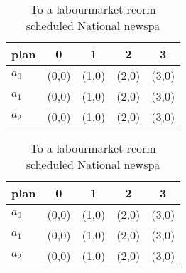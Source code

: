 \documentclass[a4paper]{article}
\begin{document}
\begin{table}
\begin{adjustbox}{width=0.6\columnwidth}
\begin{tabular}{|l|l|l|l|l|}
\hline
\textbf{plan} & \multicolumn{1}{c|}{\textbf{0}} & \multicolumn{1}{c|}{\textbf{1}} & \multicolumn{1}{c|}{\textbf{2}} & \multicolumn{1}{c|}{\textbf{3}} \\ \hline
\textbf{$a_0$}  & (0,0) & (1,0) & (2,0) & (3,0) \\ \hline
\textbf{$a_1$}  & (0,0) & (1,0) & (2,0) & (3,0) \\ \hline
\textbf{$a_2$}  & (0,0) & (1,0) & (2,0) & (3,0) \\ \hline
\end{tabular}
\end{adjustbox}
\caption{To a labourmarket reorm scheduled National newspa
}
\end{table}

\begin{table}
\begin{adjustbox}{width=0.6\columnwidth}
\begin{tabular}{|l|l|l|l|l|}
\hline
\textbf{plan} & \multicolumn{1}{c|}{\textbf{0}} & \multicolumn{1}{c|}{\textbf{1}} & \multicolumn{1}{c|}{\textbf{2}} & \multicolumn{1}{c|}{\textbf{3}} \\ \hline
\textbf{$a_0$}  & (0,0) & (1,0) & (2,0) & (3,0) \\ \hline
\textbf{$a_1$}  & (0,0) & (1,0) & (2,0) & (3,0) \\ \hline
\textbf{$a_2$}  & (0,0) & (1,0) & (2,0) & (3,0) \\ \hline
\end{tabular}
\end{adjustbox}
\caption{To a labourmarket reorm scheduled National newspa
}
\end{table}
\end{document}

